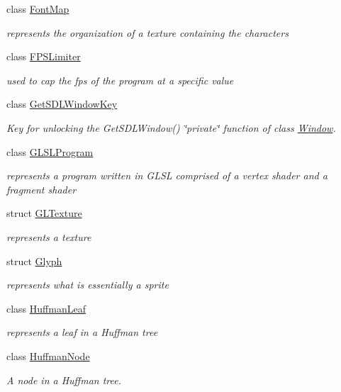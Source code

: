 \begin{DoxyCompactItemize}
class \hyperlink{classnta_1_1FontMap}{Font\+Map}
\begin{DoxyCompactList}\small\item\em represents the organization of a texture containing the characters \end{DoxyCompactList}\item 
class \hyperlink{classnta_1_1FPSLimiter}{F\+P\+S\+Limiter}
\begin{DoxyCompactList}\small\item\em used to cap the fps of the program at a specific value \end{DoxyCompactList}\item 
class \hyperlink{classnta_1_1GetSDLWindowKey}{Get\+S\+D\+L\+Window\+Key}
\begin{DoxyCompactList}\small\item\em Key for unlocking the Get\+S\+D\+L\+Window() \char`\"{}private\char`\"{} function of class \hyperlink{classnta_1_1Window}{Window}. \end{DoxyCompactList}\item 
class \hyperlink{classnta_1_1GLSLProgram}{G\+L\+S\+L\+Program}
\begin{DoxyCompactList}\small\item\em represents a program written in G\+L\+SL comprised of a vertex shader and a fragment shader \end{DoxyCompactList}\item 
struct \hyperlink{structnta_1_1GLTexture}{G\+L\+Texture}
\begin{DoxyCompactList}\small\item\em represents a texture \end{DoxyCompactList}\item 
struct \hyperlink{structnta_1_1Glyph}{Glyph}
\begin{DoxyCompactList}\small\item\em represents what is essentially a sprite \end{DoxyCompactList}\item 
class \hyperlink{classnta_1_1HuffmanLeaf}{Huffman\+Leaf}
\begin{DoxyCompactList}\small\item\em represents a leaf in a Huffman tree \end{DoxyCompactList}\item 
class \hyperlink{classnta_1_1HuffmanNode}{Huffman\+Node}
\begin{DoxyCompactList}\small\item\em A node in a Huffman tree. \end{DoxyCompactList}\item 

\end{DoxyCompactItemize}
